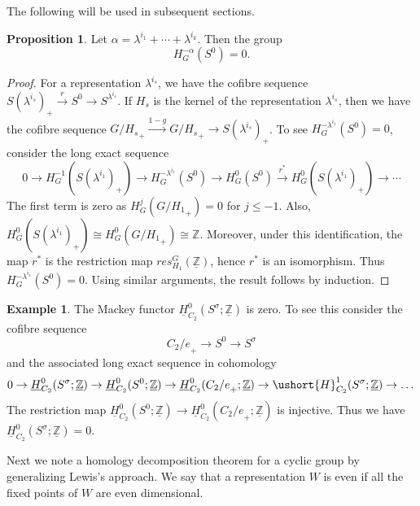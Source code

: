\documentclass[a4paper,leqno,11pt]{amsart}
\theoremstyle{plain}
\theoremstyle{definition}
\newtheorem{prop}[theorem]{Proposition}
\newtheorem{exam}[theorem]{Example}
\theoremstyle{remark}
\theoremstyle{definition}
\newcommand{\Z}{{\mathbb{Z}}}
\newcommand{\ra}{\rightarrow}
\newcommand{\uH}{\ushort{H}}
\newcommand{\uZ}{\underline{\mathbb{Z}}}
\def\Z{\mathbb{Z}}
\def\ra{\rightarrow}
\numberwithin{equation}{section}
\begin{document}
The following will be used in  subsequent sections.
	\begin{prop}\label{thm:neg htpy gr}
		Let $ \alpha={\lambda^{i_1}+\cdots+\lambda^{i_k}} $. Then the group 
		\[
		H_G^{-\alpha} (S^0)=0 .
		\]
	\end{prop}
\begin{proof}
	 For a representation $ \lambda^{i_s} $, we have the cofibre sequence $ S(\lambda^{i_s})_+\xrightarrow{r} S^0\to S^{\lambda^{i_s}} $. If $ H_s $ is the kernel of the representation  $ \lambda^{i_s} $, then we have the cofibre sequence  $ {G/H_s}_+  \stackrel{1-g}{\to} {G/H_s}_+\to S(\lambda^{i_s})_+$. To see $ H_G^{-\lambda^{i_1}} (S^0)=0$, consider the long exact sequence 
	\[
0\to H^{-1}_G(S(\lambda^{i_1})_+)\to H_G^{-\lambda^{i_1}}(S^0)\to 	H^0_G(S^0)\xrightarrow{r^*} H_G^0(S(\lambda^{i_1})_+)\to \cdots 
	\]
	The first term is zero  as $H^{j}_G({G/H_{1}}_+)=0  $ for $ j\le -1 $. Also,  $ H_G^0(S(\lambda^{i_1})_+)\cong  H^{0}_G({G/H_{1}}_+)\cong \Z$. Moreover, under this identification, the map $ r^* $ is the restriction map $ res^G_{H_1} (\uZ)$, hence $ r^* $ is an isomorphism. Thus $ H_G^{-\lambda^{i_1}} (S^0)=0$. Using similar arguments, the result  follows by induction. 
\end{proof}
\begin{exam}\label{exam S sigma }
	 The Mackey functor $ \underline{H}_{C_{2}}^{0}(S^\sigma;\uZ)$ is zero. To see this consider the cofibre sequence $${C_{2}/e}_{+}\ra S^0 \ra S^{\sigma}$$ and the associated long exact sequence in cohomology 
	$$0\to  \underline{H}^{0}_{C_{2}}(S^{\sigma};\uZ)\ra \underline{H}^{0}_{C_{2}}(S^0;\uZ)\ra \underline{H}^{0}_{C_{2}}({C_{2}/e}_{+};\uZ)\ra \uH_{C_2}^{1}(S^{\sigma};\uZ)\ra \dots $$
	The restriction map $\underline{H}_{C_2}^{0}(S^0;\uZ)\ra \underline{H}_{C_2}^{0}({C_{2}/e}_{+};\uZ) $ is injective.
	Thus we have $\underline{H}_{C_2}^{0}(S^{\sigma};\uZ)= 0$.
\end{exam}
	Next we note a homology decomposition theorem for a cyclic group by generalizing Lewis's approach. We say that a representation $W$ is even if all the fixed points of $W$ are even dimensional.
	
	
	
\end{document}
